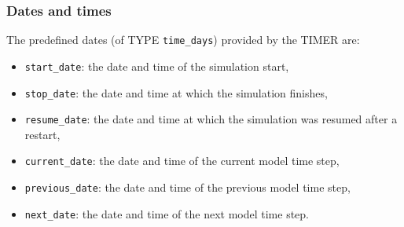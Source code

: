 \documentclass[twoside]{article}
\begin{document}
\subsubsection{Dates and times}
\label{sec:dates}
%
The predefined dates (of {\footnotesize TYPE} \verb|time_days|) provided by the TIMER
are:
%
\begin{itemize}
\item \verb|start_date|: the date and time of the simulation start,
\item \verb|stop_date|: the date and time at which the simulation finishes,
\item \verb|resume_date|: the date and time at which the simulation was
      resumed after a restart,
\item \verb|current_date|: the date and time of the current model time step,
\item \verb|previous_date|: the date and time of the previous model time step,
\item \verb|next_date|: the date and time of the next model time step.
\end{itemize}

\end{document}
